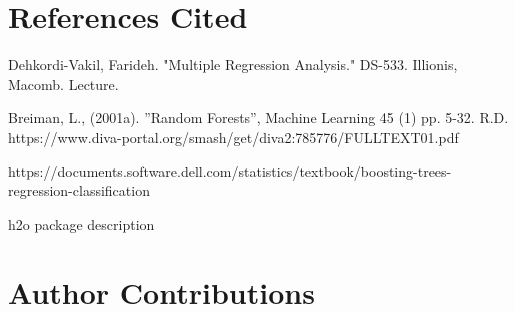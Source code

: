 \documentclass[letterpaper,twocolumn,10pt]{article}
\begin{document}
\section{References Cited}

Dehkordi-Vakil, Farideh. "Multiple Regression Analysis." DS-533. Illionis, Macomb. Lecture.

Breiman, L., (2001a). ”Random Forests”, Machine Learning 45 (1) pp. 5-32.
R.D. https://www.diva-portal.org/smash/get/diva2:785776/FULLTEXT01.pdf


https://documents.software.dell.com/statistics/textbook/boosting-trees-regression-classification

h2o package description


\section{Author Contributions}
\end{document}
